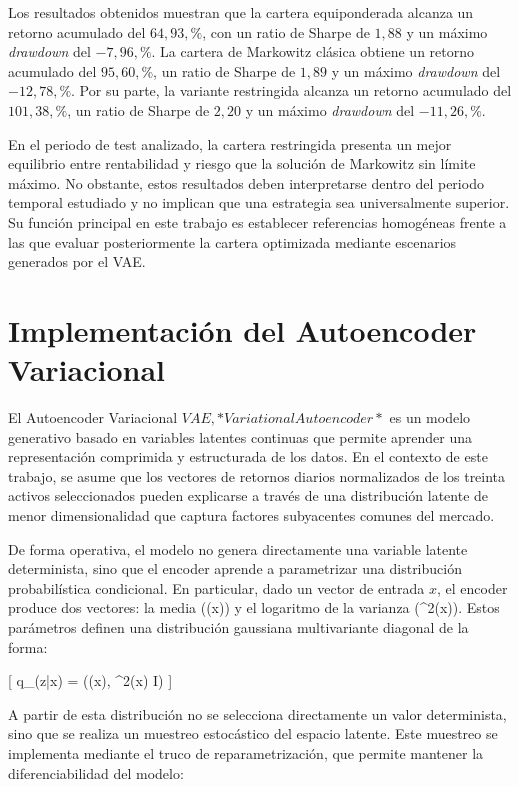 Los resultados obtenidos muestran que la cartera equiponderada alcanza un retorno acumulado del \(64{,}93,\%\), con un ratio de Sharpe de \(1{,}88\) y un máximo \textit{drawdown} del \(-7{,}96,\%\). La cartera de Markowitz clásica obtiene un retorno acumulado del \(95{,}60,\%\), un ratio de Sharpe de \(1{,}89\) y un máximo \textit{drawdown} del \(-12{,}78,\%\). Por su parte, la variante restringida alcanza un retorno acumulado del \(101{,}38,\%\), un ratio de Sharpe de \(2{,}20\) y un máximo \textit{drawdown} del \(-11{,}26,\%\).

En el periodo de test analizado, la cartera restringida presenta un mejor equilibrio entre rentabilidad y riesgo que la solución de Markowitz sin límite máximo. No obstante, estos resultados deben interpretarse dentro del periodo temporal estudiado y no implican que una estrategia sea universalmente superior. Su función principal en este trabajo es establecer referencias homogéneas frente a las que evaluar posteriormente la cartera optimizada mediante escenarios generados por el VAE.


\section{Implementación del Autoencoder Variacional}

El Autoencoder Variacional \(VAE, *Variational Autoencoder*\) es un modelo generativo basado en variables latentes continuas que permite aprender una representación comprimida y estructurada de los datos. En el contexto de este trabajo, se asume que los vectores de retornos diarios normalizados de los treinta activos seleccionados pueden explicarse a través de una distribución latente de menor dimensionalidad que captura factores subyacentes comunes del mercado.

De forma operativa, el modelo no genera directamente una variable latente determinista, sino que el encoder aprende a parametrizar una distribución probabilística condicional. En particular, dado un vector de entrada \(x\), el encoder produce dos vectores: la media (\mu(x)) y el logaritmo de la varianza (\log \sigma^2(x)). Estos parámetros definen una distribución gaussiana multivariante diagonal de la forma:

[
q_\phi(z|x) = (\mu(x), \sigma^2(x) I)
]

A partir de esta distribución no se selecciona directamente un valor determinista, sino que se realiza un muestreo estocástico del espacio latente. Este muestreo se implementa mediante el truco de reparametrización, que permite mantener la diferenciabilidad del modelo:

